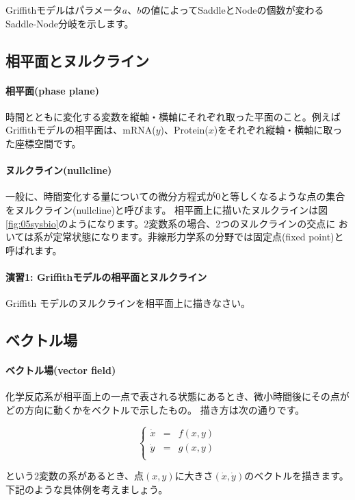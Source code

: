 Griffithモデルはパラメータ\(a\)、\(b\)の値によってSaddleとNodeの個数が変わるSaddle-Node分岐を示します。

\subsection{相平面とヌルクライン}
\paragraph{相平面(phase plane)}
時間とともに変化する変数を縦軸・横軸にそれぞれ取った平面のこと。例えばGriffithモデルの相平面は、mRNA(\(y\))、Protein(\(x\))をそれぞれ縦軸・横軸に取った座標空間です。

\paragraph{ヌルクライン(nullcline)} 一般に、時間変化する量についての微分方程式が0と等しくなるような点の集合をヌルクライン(nullcline)と呼びます。
相平面上に描いたヌルクラインは図\ref{fig:05sysbio}のようになります。2変数系の場合、2つのヌルクラインの交点に
おいては系が定常状態になります。非線形力学系の分野では固定点(fixed point)と呼ばれます。

\paragraph{演習1:  Griffithモデルの相平面とヌルクライン}
Griffith モデルのヌルクラインを相平面上に描きなさい。

\subsection{ベクトル場}
\paragraph{ベクトル場(vector field)}
化学反応系が相平面上の一点で表される状態にあるとき、微小時間後にその点がどの方向に動くかをベクトルで示したもの。
描き方は次の通りです。

\[
\left\{
\begin{array}{lclclll}
\dot x & = & f(x,y)\\
\dot y & = & g(x,y)\\
\end{array}
\right.\]

という2変数の系があるとき、点\((x,y)\)に大きさ\((\dot x , \dot y)\)のベクトルを描きます。
下記のような具体例を考えましょう。

